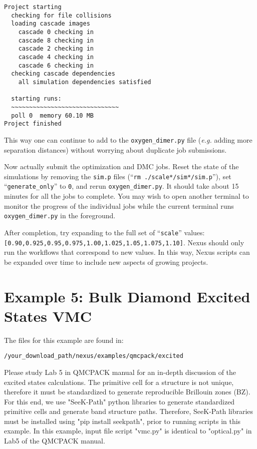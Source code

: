 \documentclass[oneside,11pt]{memoir}
\numberwithin{equation}{section}
\begin{document}
\begin{shaded}
\begin{verbatim}
Project starting 
  checking for file collisions 
  loading cascade images 
    cascade 0 checking in 
    cascade 8 checking in 
    cascade 2 checking in 
    cascade 4 checking in 
    cascade 6 checking in 
  checking cascade dependencies 
    all simulation dependencies satisfied 
  
  starting runs:
  ~~~~~~~~~~~~~~~~~~~~~~~~~~~~~~ 
  poll 0  memory 60.10 MB 
Project finished
\end{verbatim}
\end{shaded}
\noindent
This way one can continue to add to the \texttt{oxygen\_dimer.py} file (\emph{e.g.} adding more separation distances) without worrying about duplicate job submissions.

Now actually submit the optimization and DMC jobs.  Reset the state of the simulations by removing the \texttt{sim.p} files (``\texttt{rm ./scale*/sim*/sim.p}''), set ``\texttt{generate\_only}'' to \texttt{0}, and rerun \texttt{oxygen\_dimer.py}.  It should take about 15 minutes for all the jobs to complete.  You may wish to open another terminal to monitor the progress of the individual jobs while the current terminal runs \texttt{oxygen\_dimer.py} in the foreground.  

After completion, try expanding to the full set of ``\texttt{scale}'' values:\newline \texttt{[0.90,0.925,0.95,0.975,1.00,1.025,1.05,1.075,1.10]}.  Nexus should only run the workflows that correspond to new values.  In this way, Nexus scripts can be expanded over time to include new aspects of growing projects. 


\section{Example 5: Bulk Diamond Excited States VMC}\label{excited}
The files for this example are found in:
\begin{shaded}
\begin{verbatim}
/your_download_path/nexus/examples/qmcpack/excited
\end{verbatim}
\end{shaded}

Please study Lab 5 in QMCPACK manual for an in-depth discussion of the excited states calculations. The primitive cell for a structure is not unique, therefore it must be standardized to generate reproducible Brillouin zones (BZ). For this end, we use "SeeK-Path" python libraries to generate standardized primitive cells and generate band structure paths. Therefore, SeeK-Path libraries must be installed using "pip install seekpath", prior to running scripts in this example. 
In this example, input file script "vmc.py" is identical to "optical.py" in Lab5 of the QMCPACK manual. 
\end{document}
